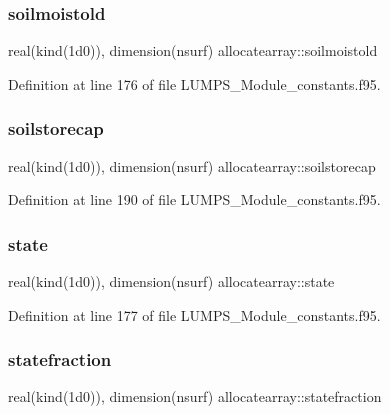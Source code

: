 \subsubsection{\texorpdfstring{soilmoistold}{soilmoistold}}
{\footnotesize\ttfamily real(kind(1d0)), dimension(nsurf) allocatearray\+::soilmoistold}



Definition at line 176 of file L\+U\+M\+P\+S\+\_\+\+Module\+\_\+constants.\+f95.

\mbox{\label{namespaceallocatearray_a1c0a391fbf8e63a46d93cae2c6c11049}} 
\subsubsection{\texorpdfstring{soilstorecap}{soilstorecap}}
{\footnotesize\ttfamily real(kind(1d0)), dimension(nsurf) allocatearray\+::soilstorecap}



Definition at line 190 of file L\+U\+M\+P\+S\+\_\+\+Module\+\_\+constants.\+f95.

\mbox{\label{namespaceallocatearray_a1573a7ac84781a2f33ba27e9b4fd7fc4}} 
\subsubsection{\texorpdfstring{state}{state}}
{\footnotesize\ttfamily real(kind(1d0)), dimension(nsurf) allocatearray\+::state}



Definition at line 177 of file L\+U\+M\+P\+S\+\_\+\+Module\+\_\+constants.\+f95.

\mbox{\label{namespaceallocatearray_a4ff0bd306cbe29d16f46ecdd19327b61}} 
\subsubsection{\texorpdfstring{statefraction}{statefraction}}
{\footnotesize\ttfamily real(kind(1d0)), dimension(nsurf) allocatearray\+::statefraction}



